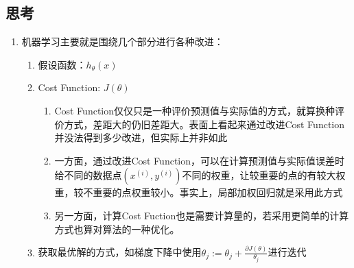 \subsection{思考}
{\color{red}{以下内容均为个人的思考，不一定是正确的。}}
\begin{enumerate}
	\item 机器学习主要就是围绕几个部分进行各种改进：
	\begin{enumerate}
		\item 假设函数：$h_\theta(x)$
		\item Cost Function: $J(\theta)$
			\begin{enumerate}
				\item Cost Function仅仅只是一种评价预测值与实际值的方式，就算换种评价方式，差距大的仍旧差距大。表面上看起来通过改进Cost Function并没法得到多少改进，但实际上并非如此
				\item 一方面，通过改进Cost Function，可以在计算预测值与实际值误差时给不同的数据点$(x^{(i)}, y^{(i)})$不同的权重，让较重要的点的有较大权重，较不重要的点权重较小。事实上，局部加权回归就是采用此方式
				\item 另一方面，计算Cost Fuction也是需要计算量的，若采用更简单的计算方式也算对算法的一种优化。{\color{gray}{暂未找到实例}}
			\end{enumerate}
		\item 获取最优解的方式，如梯度下降中使用$\theta_j := \theta_j + \frac{\partial J(\theta)}{\theta_j}$进行迭代

	\end{enumerate}
\end{enumerate}
















